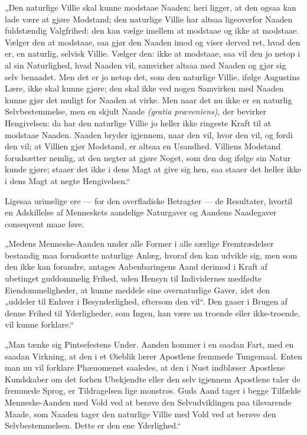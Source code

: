 \documentclass[12pt]{book}
\begin{document}
„Den naturlige Villie skal kunne modstaae Naaden; heri ligger, at
den ogsaa kan lade være at gjøre Modstand; den naturlige Villie har
altsaa ligeoverfor Naaden fuldstændig Valgfrihed: den kan vælge
imellem at modstaae og ikke at modstaae. Vælger den at modstaae, saa
gjør den Naaden imod og viser derved ret, hvad den er, en naturlig,
selvisk Villie. Vælger den: ikke at modstaae, saa vil den jo netop i
al sin Naturlighed, hvad Naaden vil, samvirker altsaa med Naaden og
gjør sig selv benaadet. Men det er jo netop det, som den naturlige
Villie, ifølge Augustins Lære, ikke skal kunne gjøre; den skal ikke
ved nogen Samvirken med Naaden kunne gjør det muligt for Naaden at
virke. Men naar det nu ikke er en naturlig Selvbestemmelse, men en
skjult Naade \textit{(gratia præveniens)}, der bevirker
Hengivelsen: da har den naturlige Villie jo heller ikke ringeste
Kraft til at modstaae Naaden. Naaden bryder igjennem, naar den vil,
hvor den vil, og fordi den vil; at Villien gjør Modstand, er altsaa
en Usandhed. Villiens Modstand forudsætter nemlig, at den negter at
gjøre Noget, som den dog ifølge sin Natur kunde gjøre; staaer det
ikke i dens Magt at give sig hen, saa staaer det heller ikke i dens
Magt at negte Hengivelsen.“

Ligesaa urimelige ere --- for den overfladiske Betragter --- de
Resultater, hvortil en Adskillelse af Menneskets
aandelige Naturgaver og Aandens Naadegaver conseqvent maae føre.

„Medens Menneske-Aanden under alle Former i alle særlige
Fremtrædelser bestandig maa forudsætte naturlige Anlæg, hvoraf den
kan udvikle sig, men som den ikke kan forandre, antages
Aabenbaringens Aand derimod i Kraft af ubetinget guddommelig Frihed,
uden Hensyn til Individernes medfødte Eiendommeligheder, at kunne
meddele sine overnaturlige Gaver, idet den „uddeler til Enhver i
Besynderlighed, eftersom den vil“. Den gaaer i Brugen af denne
Frihed til Yderligheder, som Ingen, han være nu troende eller
ikke-troende, vil kunne forklare.“

„Man tænke sig Pintsefestens Under. Aanden kommer i en saadan Fart,
med en saadan Virkning, at den i et Øieblik lærer Apostlene fremmede
Tungemaal. Enten man nu vil forklare Phænomenet saaledes, at den i
Nuet indblæser Apostlene Kundskaber om det forhen Ubekjendte eller
den selv igjennem Apostlene taler de fremmede Sprog, er Tildragelsen
lige monstrøs. Guds Aand tager i begge Tilfælde Menneske-Aanden med
Vold ved at berøve den Selvudviklingen paa tilsvarende Maade, som
Naaden tager den naturlige Villie med Vold ved at berøve den
Selvbestemmelsen. Dette er den ene Yderlighed.“
\end{document}

